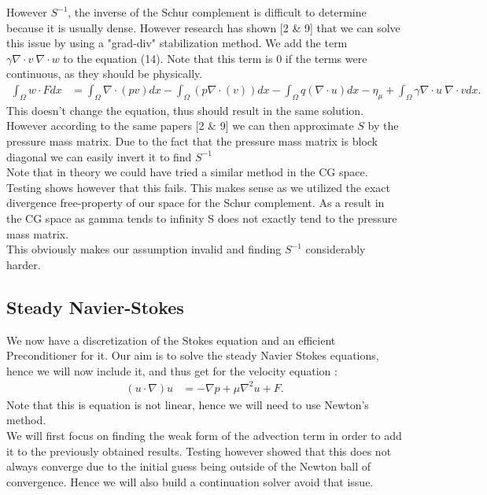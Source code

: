 \documentclass[11pt,twoside,a4paper]{article}
\begin{document}
 However $S^{-1}$, the inverse of the Schur complement is difficult to determine because it is usually dense. However research has shown [2 \& 9] that we can solve this issue by using a "grad-div" stabilization method. We add the term $\gamma \nabla \cdot v \: \nabla \cdot w$ to the equation (14). Note that this term is 0 if the terms were continuous, as they should be physically.
\begin{align}
\int_\Omega w \cdot F dx &= \int_\Omega \nabla \cdot (p v) dx - \int_\Omega ( p \nabla \cdot (v)) dx - \int_\Omega q (\nabla \cdot u) dx  - \eta_\mu + \int_\Omega \gamma \nabla \cdot u \: \nabla \cdot v dx .
\end{align}
This doesn't change the equation, thus should result in the same solution. However according to the same papers [2 \& 9] we can then approximate $S$ by the pressure mass matrix. Due to the fact that the pressure mass matrix is block diagonal we can easily invert it to find $S^{-1}$
\\
Note that in theory we could have tried a similar method in the CG space.
Testing shows however that this fails.
This makes sense as we utilized the exact divergence free-property of our space for the Schur complement.
As a result in the CG space as gamma tends to infinity S does not exactly tend to the pressure mass matrix.\\
This obviously makes our assumption invalid and finding $S^{-1}$ considerably harder.

\subsection{Steady Navier-Stokes}
We now have a discretization of the Stokes equation and an efficient Preconditioner for it.
Our aim is to solve the steady Navier Stokes equations, hence we will now include it, and thus get for the velocity equation :
\begin{align*}
(u \cdot \nabla) u &= -\nabla p + \mu \nabla^2 u + F .
\end{align*}
Note that this is equation is not linear, hence we will need to use Newton's method.\\
We will first focus on finding the weak form of the advection term in order to add it to the previously obtained results. Testing however showed that this does not always converge due to the initial guess being outside of the Newton ball of convergence. Hence we will also build a continuation solver avoid that issue.
\end{document}
